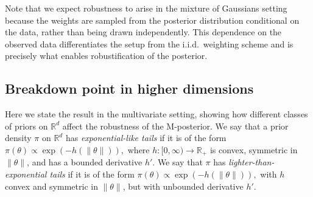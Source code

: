 \documentclass[11pt, oneside]{amsart}
\theoremstyle{definition}   %
\begin{document}
Note that we expect robustness to arise in the mixture of Gaussians setting because the weights are sampled from the posterior distribution conditional on the data, rather than being drawn independently. This dependence on the observed data differentiates the setup from the i.i.d.\ weighting scheme and is precisely what enables robustification of the posterior.

\subsection{Breakdown point in higher dimensions}
\label{app:BP_general_d}
%
Here we state the result in the multivariate setting, showing how different classes of priors on $\mathbb{R}^d$ affect the robustness of the M-posterior. 
We say that a prior density $\pi$ on $\mathbb{R}^d$ has \emph{exponential-like tails} if it is of the form
%
\(
    \pi(\theta) \propto \exp(-h(\|\theta\|)),
\)
%
where $h:[0,\infty)\to\mathbb{R}_+$ is convex, symmetric in $\|\theta\|$, and has a bounded derivative $h'$. 
%
We say that $\pi$ has \emph{lighter-than-exponential tails} if it is of the form
\(
    \pi(\theta) \propto \exp(-h(\|\theta\|)),
\)
%
with $h$ convex and symmetric in $\|\theta\|$, but with unbounded derivative $h'$.
%
\end{document}
